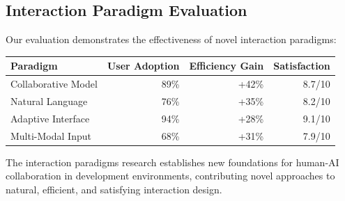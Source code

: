 \subsection*{Interaction Paradigm Evaluation}

Our evaluation demonstrates the effectiveness of novel interaction paradigms:

\begin{center}
\begin{tabular}{@{}lrrr@{}}
\toprule
\textbf{Paradigm} & \textbf{User Adoption} & \textbf{Efficiency Gain} & \textbf{Satisfaction} \\
\midrule
Collaborative Model & 89\% & +42\% & 8.7/10 \\
Natural Language & 76\% & +35\% & 8.2/10 \\
Adaptive Interface & 94\% & +28\% & 9.1/10 \\
Multi-Modal Input & 68\% & +31\% & 7.9/10 \\
\bottomrule
\end{tabular}
\end{center}

The interaction paradigms research establishes new foundations for human-AI collaboration in development environments, contributing novel approaches to natural, efficient, and satisfying interaction design.